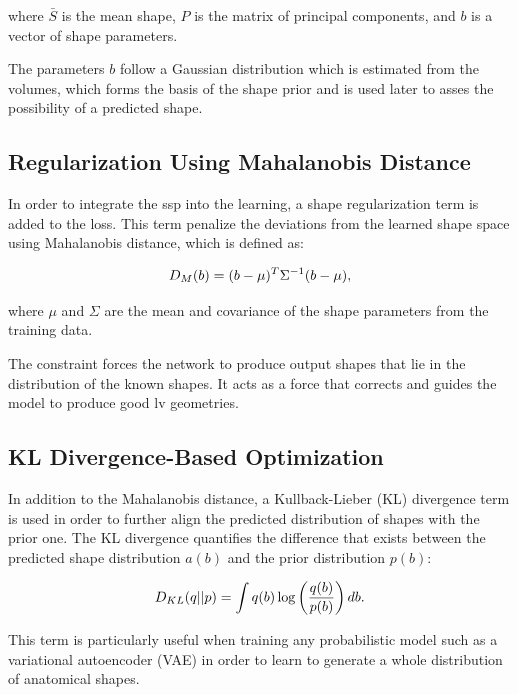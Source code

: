 where $\bar{S}$ is the mean shape, $P$ is the matrix of principal components, and $b$ is a vector of shape parameters.

The parameters $b$ follow a Gaussian distribution which is estimated from the volumes, which forms the basis of the shape prior and is used later to asses the possibility of a predicted shape.

\subsection{Regularization Using Mahalanobis Distance}
In order to integrate the \gls{ssp} into the learning, a shape regularization term is added to the loss. This term penalize the deviations from the learned shape space using Mahalanobis distance, which is defined as:

\begin{equation} 
\addcontentsline{equ}{equations}{\protect\numberline{\theequation}Mahalanobis Distance}
D_M(b) = (b - \mu)^T \Sigma^{-1} (b - \mu), 
\end{equation}

where $\mu$ and $\Sigma$ are the mean and covariance of the shape parameters from the training data.

The constraint forces the network to produce output shapes that lie in the distribution of the known shapes. It acts as a force that corrects and guides the model to produce good \gls{lv} geometries.

\subsection{KL Divergence-Based Optimization}
In addition to the Mahalanobis distance, a Kullback-Lieber (KL) divergence term is used in order to further align the predicted distribution of shapes with the prior one. The KL divergence quantifies the difference that exists between the predicted shape distribution $a(b)$ and the prior distribution $p(b)$:

\begin{equation} 
\addcontentsline{equ}{equations}{\protect\numberline{\theequation}KL Divergence}
D_{KL}(q || p) = \int q(b) \log \left(\frac{q(b)}{p(b)}\right) db. 
\end{equation}

This term is particularly useful when training any probabilistic model such as a variational autoencoder (VAE) in order to learn to generate a whole distribution of anatomical shapes.

